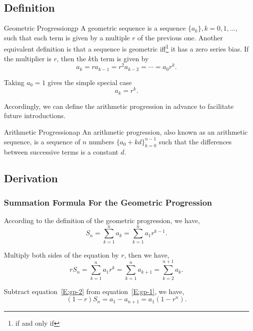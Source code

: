 \subsection{Definition}
\begin{defnbox}{Geometric Progression\cite{Weisstein2019gp}}{gp}
    A geometric sequence is a sequence $\{a_k\}, k=0, 1, \ldots$, such that each term is given by a multiple $r$ of the previous one. Another equivalent definition is that a sequence is geometric iff\footnote{if and only if} it has a zero series bias. If the multiplier is $r$, then the $k$th term is given by
    \[
        a_k = ra_{k-1} = r^2a_{k-2} = \cdots = a_0r^k.
    \]

    Taking $a_0=1$ gives the simple special case
    \[
        a_k = r^k.
    \]
\end{defnbox}

Accordingly, we can define the arithmetic progression in advance to facilitate future introductions.
\begin{defnbox}{Arithmetic Progression\cite{Weisstein2019ap}}{ap}
    An arithmetic progression, also known as an arithmetic sequence, is a sequence of $n$ numbers $\{a_0+kd\}^{n-1}_{k=0}$ such that the differences between successive terms is a constant $d$.
\end{defnbox}


\subsection{Derivation}
\subsubsection{Summation Formula For the Geometric Progression}
According to the definition of the geometric progression, we have,
\begin{equation}\label{E:gp-1}
    S_n = \sum_{k=1}^{n} a_k = \sum_{k=1}^{n} a_1 r^{k-1}.
\end{equation}

Multiply both sides of the equation by $r$, then we have,
\begin{equation}\label{E:gp-2}
    rS_n = \sum_{k=1}^{n} a_1 r^{k} = \sum_{k=1}^{n} a_{k+1} = \sum_{k=2}^{n+1} a_k.
\end{equation}

Subtract equation~\eqref{E:gp-2} from equation~\eqref{E:gp-1}, we have,
\begin{equation}\label{E:gp-3}
    (1-r) S_n = a_1 - a_{n+1} = a_1(1-r^n).
\end{equation}

